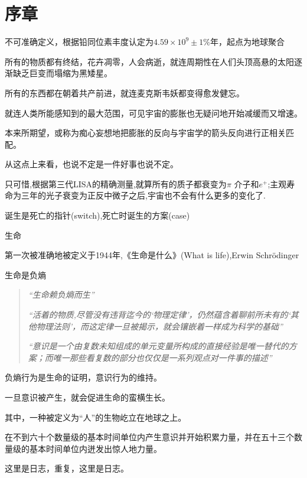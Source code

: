 \chapter[prologue]{序章}
\centerline{不可准确定义，根据铅同位素丰度认定为$4.59×10^9\pm 1\%$年，起点为地球聚合}

所有的物质都有终结，花卉凋零，人会病逝，就连周期性在人们头顶高悬的太阳逐渐缺乏巨变而塌缩为黑矮星。

所有的东西都在朝着共产前进，就连麦克斯韦妖都变得愈发健忘。

就连人类所能感知到的最大范围，可见宇宙的膨胀也无疑问地开始减缓而又增速。

本来所期望，或称为痴心妄想地把膨胀的反向与宇宙学的箭头反向进行正相关匹配。

从这点上来看，也说不定是一件好事也说不定。

只可惜,根据第三代LISA的精确测量,就算所有的质子都衰变为$\pi$	介子和$e^+$;主观寿命为三年的光子衰变为正反中微子之后,宇宙也不会有什么更多的变化了.

诞生是死亡的指针(switch),死亡时诞生的方案(case)

生命

第一次被准确地被定义于1944年,《生命是什么》(What is life),Erwin Schrödinger

生命是负熵

\begin{quote}
	
	\textit{“生命赖负熵而生”}
	
	
	\textit{“活着的物质,尽管没有违背迄今的‘物理定律’，仍然蕴含着聊前所未有的‘其他物理法则’，而这定律一旦被揭示，就会镶嵌着一样成为科学的基础”}
	
	
	\textit{“意识是一个由复数未知组成的单元变量所构成的直接经验是唯一替代的方案；而唯一那些看复数的部分也仅仅是一系列观点对一件事的描述”}
\end{quote}

负熵行为是生命的证明，意识行为的维持。

一旦意识被产生，就会促进生命的蛮横生长。

其中，一种被定义为“人”的生物屹立在地球之上。

在不到六十个数量级的基本时间单位内产生意识并开始积累力量，并在五十三个数量级的基本时间单位内迸发出惊人地力量。

这里是日志，重复，这里是日志。